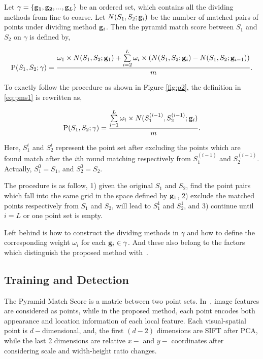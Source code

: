 Let $\gamma  = \{ {\bf{g}_1},{\bf{g}_2},...,{\bf{g}}_L\}$ be an ordered set, which contains all the dividing methods from fine to coarse. Let $N(S_1,S_2;{\bf{g}}_i)$ be the number of matched pairs of points under dividing method ${\bf{g}}_i$. Then the pyramid match score between $S_1$ and $S_2$ on $\gamma$ is defined by,

\begin{equation}
{\rm P}(S_1,S_2;\gamma)=\frac{{\omega}_1 \times N(S_1,S_2; {\bf{g}}_1) + \sum\limits^L_{i=2}{{\omega}_i\times( N(S_1,S_2;{\bf{g}}_i)-N(S_1,S_2;{\bf{g}}_{i-1}) ) }}{m}
.
\label{eq:pms1}
\end{equation}

To exactly follow the procedure as shown in Figure \ref{fig:p2}, the definition in \ref{eq:pms1} is rewritten as,

\begin{equation}
{\rm P}(S_1,S_2;\gamma)=\frac{ \sum\limits^L_{i=1}{{\omega}_i\times N(S_1^{(i-1)},S_2^{(i-1)};{\bf{g}}_i) }}{m}
.
\label{eq:pms2}
\end{equation}

Here, $S_1^i$ and $S_2^i$ represent the point set after excluding the points which are found match after the $i$th round matching respectively from $S_1^{(i-1)}$ and $S_2^{(i-1)}$. Actually, $S_1^0=S_1$, and $S_2^0=S_2$.

The procedure is  as follow, 1) given the original $S_1$ and $S_2$, find the point pairs which fall into the same grid in the space defined by ${\bf g}_1$, 2) exclude the matched points respectively from $S_1$ and $S_2$, will lead to $S_1^1$ and $S_2^1$, and 3) continue until $i=L$ or one point set is empty.

Left behind is how to construct the dividing methods in $\gamma$ and how to define the corresponding weight ${\omega}_i$ for each ${\bf{g}}_i \in \gamma$.
And these also belong to the factors which distinguish the proposed method with~\citep{pmk}.


\subsection{Training and Detection}

The Pyramid Match Score is a matric between two point sets. In~\citep{pmk}, image features are considered as points, while in the proposed method, each point encodes both appearance and location information of each local feature. Each visual-spatial point is $d-$dimensional, and, the first $(d-2)$ dimensions are SIFT after PCA, while the last 2 dimensions are relative $x-$ and $y-$ coordinates after considering scale and width-height ratio changes.

